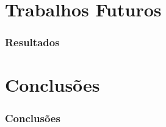 \section{Trabalhos Futuros}
\begin{frame}
	\frametitle{Resultados}
	
	
	
	
\end{frame}
\section{Conclusões}
\begin{frame}
	\frametitle{Conclusões}
	
	
	
	
\end{frame}




















